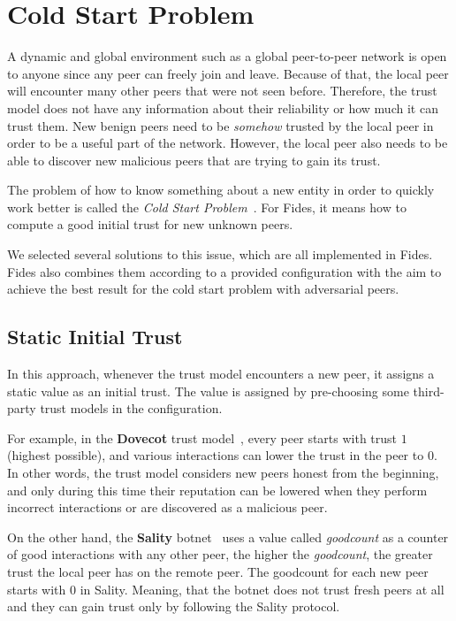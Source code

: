 \section{Cold Start Problem}
\label{sec:cold-start-problem}
A dynamic and global environment such as a global peer-to-peer network is open to anyone since any peer can freely join and leave. Because of that, the local peer will encounter many other peers that were not seen before. Therefore, the trust model does not have any information about their reliability or how much it can trust them. 
New benign peers need to be \textit{somehow} trusted by the local peer in order to be a useful part of the network. However, the local peer also needs to be able to discover new malicious peers that are trying to gain its trust.

The problem of how to know something about a new entity in order to quickly work better is called the \textit{Cold Start Problem}~\cite{christensen2014hybrid}. For Fides, it means how to compute a good initial trust for new unknown peers. 

We selected several solutions to this issue, which are all implemented in Fides. Fides also combines them according to a provided configuration with the aim to achieve the best result for the cold start problem with adversarial peers.

\subsection{Static Initial Trust}
\label{subsec:static-initial-trust}
In this approach, whenever the trust model encounters a new peer, it assigns a static value as an initial trust. The value is assigned by pre-choosing some third-party trust models in the configuration.

For example, in the \textbf{Dovecot} trust model~\cite{dita}, every peer starts with trust $1$ (highest possible), and various interactions can lower the trust in the peer to $0$. In other words, the trust model considers new peers honest from the beginning, and only during this time their reputation can be lowered when they perform incorrect interactions or are discovered as a malicious peer.

On the other hand, the \textbf{Sality} botnet~\cite{falliere2011sality} uses a value called \textit{goodcount} as a counter of good interactions with any other peer, the higher the \textit{goodcount}, the greater trust the local peer has on the remote peer. The goodcount for each new peer starts with $0$ in Sality. Meaning, that the botnet does not trust fresh peers at all and they can gain trust only by following the Sality protocol.

